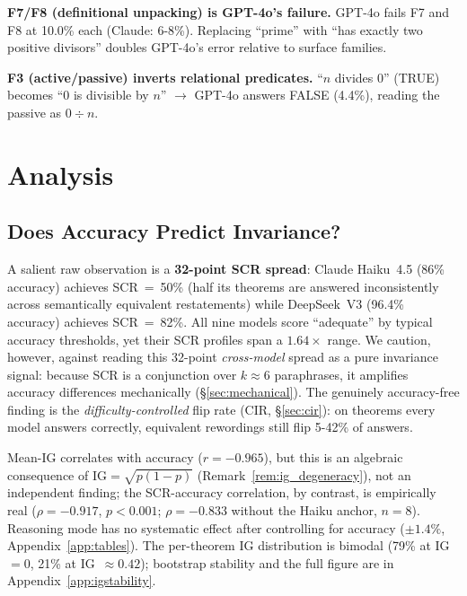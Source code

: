 \documentclass{article}
\begin{document}
\textbf{F7/F8 (definitional unpacking) is GPT-4o's failure.}
GPT-4o fails F7 and F8 at 10.0\% each (Claude: 6-8\%).
Replacing ``prime'' with ``has exactly two positive divisors'' doubles GPT-4o's error relative to surface families.

\textbf{F3 (active/passive) inverts relational predicates.}
``$n$ divides $0$'' (TRUE) becomes ``$0$ is divisible by $n$'' $\to$ GPT-4o answers FALSE (4.4\%), reading the passive as $0 \div n$.

\section{Analysis}
\label{sec:analysis}

\subsection{Does Accuracy Predict Invariance?}
\label{sec:accuracy_ig}

A salient raw observation is a \textbf{32-point SCR spread}: Claude Haiku~4.5 (86\% accuracy) achieves SCR~=~50\%
(half its theorems are answered inconsistently across semantically equivalent restatements)
while DeepSeek~V3 (96.4\% accuracy) achieves SCR~=~82\%.
All nine models score ``adequate'' by typical accuracy thresholds, yet their SCR profiles span a $1.64\times$ range.
We caution, however, against reading this 32-point \emph{cross-model} spread as a pure invariance signal: because SCR is a conjunction over $k\approx6$ paraphrases, it amplifies accuracy differences mechanically (\S\ref{sec:mechanical}).
The genuinely accuracy-free finding is the \emph{difficulty-controlled} flip rate (CIR, \S\ref{sec:cir}): on theorems every model answers correctly, equivalent rewordings still flip 5-42\% of answers.

Mean-IG correlates with accuracy ($r=-0.965$), but this is an algebraic consequence of $\mathrm{IG}=\sqrt{p(1-p)}$ (Remark~\ref{rem:ig_degeneracy}), not an independent finding; the SCR-accuracy correlation, by contrast, is empirically real ($\rho=-0.917$, $p<0.001$; $\rho=-0.833$ without the Haiku anchor, $n=8$). Reasoning mode has no systematic effect after controlling for accuracy ($\pm1.4\%$, Appendix~\ref{app:tables}). The per-theorem IG distribution is bimodal (79\% at IG~$=0$, 21\% at IG~$\approx0.42$); bootstrap stability and the full figure are in Appendix~\ref{app:igstability}.

\end{document}
